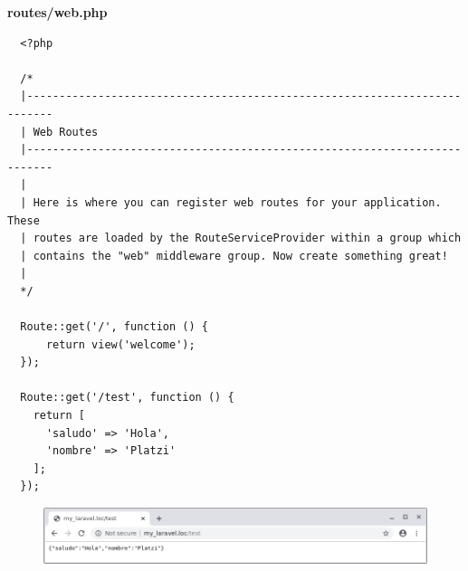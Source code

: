 \documentclass{article}
\begin{document}
\textbf{routes/web.php}
\begin{verbatim}
  <?php

  /*
  |--------------------------------------------------------------------------
  | Web Routes
  |--------------------------------------------------------------------------
  |
  | Here is where you can register web routes for your application. These
  | routes are loaded by the RouteServiceProvider within a group which
  | contains the "web" middleware group. Now create something great!
  |
  */

  Route::get('/', function () {
      return view('welcome');
  });

  Route::get('/test', function () {
    return [
      'saludo' => 'Hola',
      'nombre' => 'Platzi'
    ];
  });
\end{verbatim}

\begin{figure}[h!]
  \centering
  \includegraphics[scale=0.5]{./Pictures/005_laravel_json.png}
\end{figure}
\end{document}
